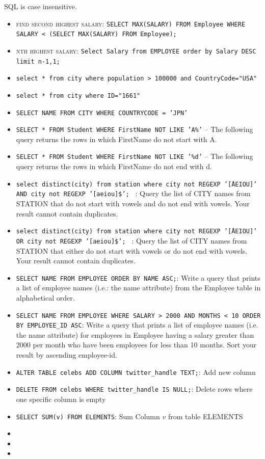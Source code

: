 \documentclass[11pt]{article}
\begin{document}
\begin{itemize}





\end{itemize}

SQL is case insensitive. 

\begin{itemize}
\item \textsc{find second highest salary}:  \texttt{SELECT MAX(SALARY) FROM Employee WHERE SALARY < (SELECT MAX(SALARY) FROM Employee);}
\item \textsc{nth highest salary:} \texttt{Select Salary from EMPLOYEE order by Salary DESC limit n-1,1;} 
\item \texttt{select * from city where population > 100000 and CountryCode="USA"} 
\item \texttt{select * from city where ID="1661"} 
\item \texttt{SELECT NAME FROM CITY WHERE COUNTRYCODE = 'JPN'} 
\item \texttt{SELECT * FROM Student WHERE FirstName NOT LIKE 'A\%'} -- The following query returns the rows in which FirstName do not start with A.
\item \texttt{SELECT * FROM Student WHERE FirstName NOT LIKE '\%d'} -- The following query returns the rows in which FirstName do not end with d.
\item \texttt{select distinct(city) from station where city not REGEXP '\^[AEIOU]' AND city not REGEXP '[aeiou]\$'; } : Query the list of CITY names from STATION that do not start with 
vowels and do not end with vowels. Your result cannot contain duplicates.
\item \texttt{select distinct(city) from station where city not REGEXP '\^[AEIOU]' OR city not REGEXP '[aeiou]\$'; } : Query the list of CITY names from STATION that either do not start with 
vowels or do not end with vowels. Your result cannot contain duplicates.
\item \texttt{SELECT NAME FROM EMPLOYEE ORDER BY NAME ASC;}: Write a query that prints a list of employee names (i.e.: the name attribute) from the Employee table in alphabetical order.
\item \texttt{SELECT NAME FROM EMPLOYEE WHERE SALARY > 2000 AND MONTHS < 10 ORDER BY EMPLOYEE\_ID ASC}: Write a query that prints a list of employee names (i.e. the name attribute) for employees in Employee having a salary greater than  2000 per month who have been employees for less than  10 months. Sort your result by ascending employee-id.
\item \texttt{ALTER TABLE celebs  ADD COLUMN twitter\_handle TEXT;}: Add new column 
\item \texttt{DELETE FROM celebs WHERE twitter\_handle IS NULL;}: Delete rows where one specific column is empty
\item \texttt{SELECT SUM(v) FROM ELEMENTS}: Sum Column $v$ from table ELEMENTS
\item 
\item 
\item 



\end{itemize}
\end{document}
